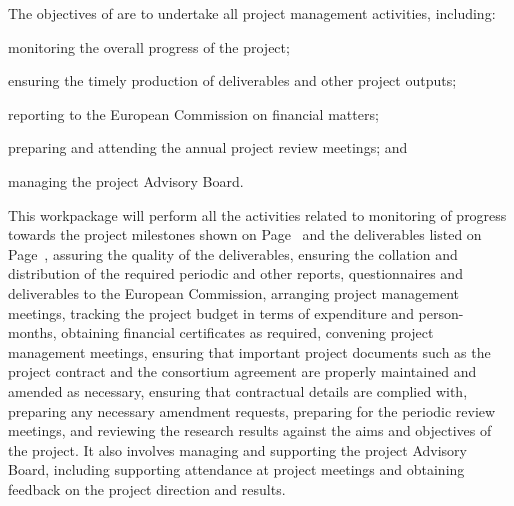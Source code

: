 \addtocounter{wpno}{1}

\begin{Workpackage}{\thewpno}
\WPTitle{\wpname{\thewpno}}

\begin{WPObjectives}
The objectives of \theWP{} are to undertake all project management activities, including:
\begin{compactitem}
\item
monitoring the overall progress of the project;
\item
ensuring the timely production of deliverables and other project outputs;
\item
reporting to the European Commission on financial matters;
\item
preparing and attending the annual project review meetings; and

\item
managing the project Advisory Board.
\end{compactitem}
\end{WPObjectives}

\begin{WPDescription}
This workpackage will perform all the activities related to monitoring
of progress towards the project milestones shown on Page~\pageref{sect:milestones}
and the deliverables listed on Page~\pageref{sect:deliverables},
assuring the quality of the deliverables, ensuring the
collation and distribution of the required periodic and other reports,
questionnaires and deliverables to
the European Commission, arranging project management meetings, tracking
the project budget in terms of expenditure and person-months,
obtaining financial certificates as required, convening project
management meetings, ensuring that important project documents
such as the project contract and the consortium agreement are
properly maintained and amended as necessary, ensuring that
contractual details are complied with, preparing any necessary amendment requests,
preparing for the periodic review meetings, and reviewing the research
results against the aims and objectives of the project.
It also involves managing and supporting the project
Advisory Board, including supporting attendance at project
meetings and obtaining feedback on the project direction and
results.
\end{WPDescription}


\end{Workpackage}
